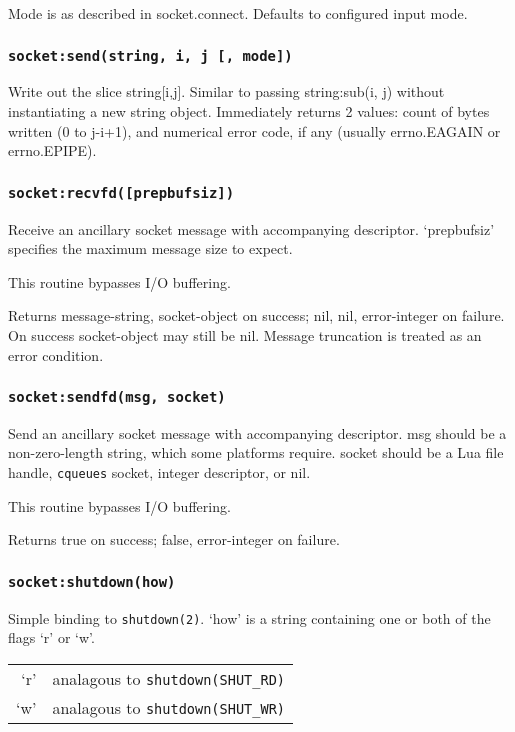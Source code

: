 \documentclass[11pt, oneside]{memoir}
\newcommand*{\cqueues}[0]{\texttt{cqueues}\xspace}
\newcommand*{\syscall}[1]{\texttt{#1}\xspace}
\newcommand*{\fn}[1]{\texttt{#1}\xspace}
\begin{document}
	Mode is as described in socket.connect. Defaults to configured
	input mode.

\subsubsection[\fn{socket:send}]{\fn{socket:send(string, i, j [, mode])}}
	Write out the slice string[i,j]. Similar to passing string:sub(i, j)
	without instantiating a new string object. Immediately returns 2
	values: count of bytes written (0 to j-i+1), and numerical error
	code, if any (usually errno.EAGAIN or errno.EPIPE).

\subsubsection[\fn{socket:recvfd}]{\fn{socket:recvfd([prepbufsiz])}}
	Receive an ancillary socket message with accompanying descriptor.
	`prepbufsiz' specifies the maximum message size to expect.

	This routine bypasses I/O buffering.

	Returns message-string, socket-object on success; nil, nil,
	error-integer on failure. On success socket-object may still be nil.
	Message truncation is treated as an error condition.

\subsubsection[\fn{socket:sendfd}]{\fn{socket:sendfd(msg, socket)}}
	Send an ancillary socket message with accompanying descriptor. msg
	should be a non-zero-length string, which some platforms require.
	socket should be a Lua file handle, \cqueues socket, integer
	descriptor, or nil.

	This routine bypasses I/O buffering.

	Returns true on success; false, error-integer on failure.

\subsubsection[\fn{socket:shutdown}]{\fn{socket:shutdown(how)}}
Simple binding to \syscall{shutdown(2)}. `how' is a string containing one or both of the flags `r' or `w'.

\begin{tabular}{r | l}
`r' & analagous to \syscall{shutdown(SHUT\_RD)} \\
`w' & analagous to \syscall{shutdown(SHUT\_WR)} \\
\end{tabular}
\end{document}
